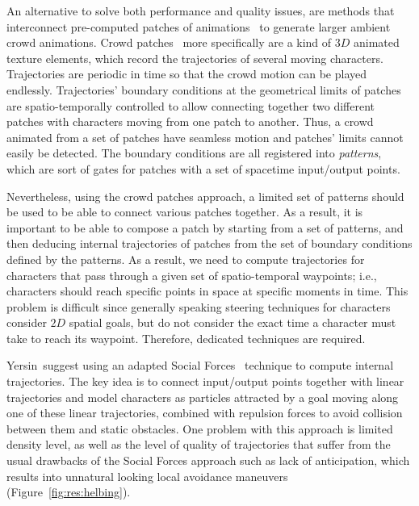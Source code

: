 An alternative to solve both performance and quality issues, are methods that interconnect pre-computed patches of animations~\cite{Yersin:2009,Kim2012Tiling,Jordao2014Crowd} to generate larger ambient crowd animations.
Crowd patches~\cite{Yersin:2009} more specifically are a kind of $3D$ animated texture elements, which record the trajectories of several moving characters.
Trajectories are periodic in time so that the crowd motion can be played endlessly.
Trajectories' boundary conditions at the geometrical limits of patches are spatio-temporally controlled to allow connecting together two different patches with characters moving from one patch to another.
Thus, a crowd animated from a set of patches have seamless motion and patches' limits cannot easily be detected.
The boundary conditions are all registered into {\it patterns}, which are sort of gates for patches with a set of spacetime input/output points.

Nevertheless, using the crowd patches approach, a limited set of patterns should be used to be able to connect various patches together.
As a result, it is important to be able to compose a patch by starting from a set of patterns, and then deducing internal trajectories of patches from the set of boundary conditions defined by the patterns.
As a result, we need to compute trajectories for characters that pass through a given set of spatio-temporal waypoints; i.e., characters should reach specific points in space at specific moments in time.
This problem is difficult since generally speaking steering techniques for characters consider $2D$ spatial goals, but do not consider the exact time a character must take to reach its waypoint.
Therefore, dedicated techniques are required. 

Yersin~\etal suggest using an adapted Social Forces~\cite{Helbing:2005} technique to compute internal trajectories.
The key idea is to connect input/output points together with linear trajectories and model characters as particles attracted by a goal moving along one of these linear trajectories, combined with repulsion forces to avoid collision between them and static obstacles.
One problem with this approach is limited density level, as well as the level of quality of trajectories that suffer from the usual drawbacks of the Social Forces approach such as lack of anticipation, which results into unnatural looking local avoidance maneuvers (Figure~\ref{fig:res:helbing}).

